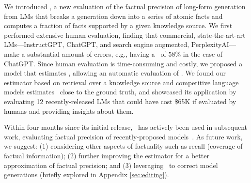 We introduced \ours, a new evaluation of the factual precision of long-form generation from LMs that breaks a generation down into a series of atomic facts and computes a fraction of facts supported by a given knowledge source.
We first performed extensive human evaluation, finding that commercial, state-the-art-art LMs---InstructGPT, ChatGPT, and search engine augmented, PerplexityAI---make a substantial amount of errors, e.g., having a \ours\ of 58\% in the case of ChatGPT.
%
Since human evaluation is time-consuming and costly, we proposed a model that estimates \ours, allowing an automatic evaluation of \ours.
We found our estimator based on retrieval over a knowledge source and competitive language models estimates \ours\ close to the ground truth, and showcased its application by evaluating 12 recently-released LMs that could have cost \$65K if evaluated by humans and providing insights about them.


Within four months since its initial release, \ours\ has actively been used in subsequent work, evaluating factual precision of recently-proposed models~\cite{ye2023flask,sun2023exploring,malaviya2023expertqa,dhuliawala2023chain}.
%
As future work, we suggest: (1) considering other aspects of factuality such as recall (coverage of factual information); (2) further improving the estimator for a better approximation of factual precision; and (3) leveraging \ours\ to correct model generations (briefly explored in Appendix \ref{sec:editing}).
